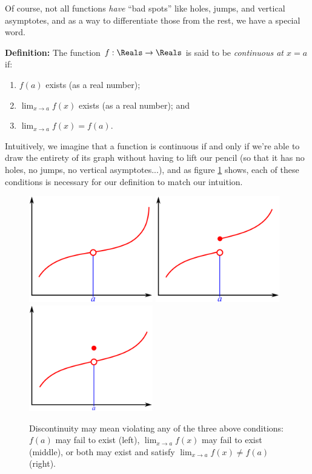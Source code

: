 \documentclass[12pt]{article}
\begin{document}
	Of course, not all functions \textit{have} ``bad spots'' like holes, jumps, and vertical asymptotes, and as a way to differentiate those from the rest, we have a special word.\vspace{6mm}
	
	\noindent\textbf{Definition:} The function $f:\Reals\to\Reals$ is said to be \textit{continuous at $x=a$} if:
	\begin{enumerate}
		\item $f(a)$ exists (as a real number);
		\item $\lim_{x\to a}f(x)$ exists (as a real number); and
		\item $\lim_{x\to a}f(x)=f(a)$.
	\end{enumerate}\vspace{3mm}

	Intuitively, we imagine that a function is continuous if and only if we're able to draw the entirety of its graph without having to lift our pencil (so that it has no holes, no jumps, no vertical asymptotes...), and as figure \ref{fig:discont} shows, each of these conditions is necessary for our definition to match our intuition.
	
	\begin{figure}[h!]
		\centering
		\includegraphics[width=2.125in]{discont1}
		\quad
		\includegraphics[width=2.125in]{discont2}
		\quad
		\includegraphics[width=2.125in]{discont3}
		\caption{Discontinuity may mean violating any of the three above conditions: $f(a)$ may fail to exist (left), $\lim_{x\to a}f(x)$ may fail to exist (middle), or both may exist and satisfy $\lim_{x\to a}f(x)\neq f(a)$ (right).}
		\label{fig:discont}
	\end{figure}
\end{document}
